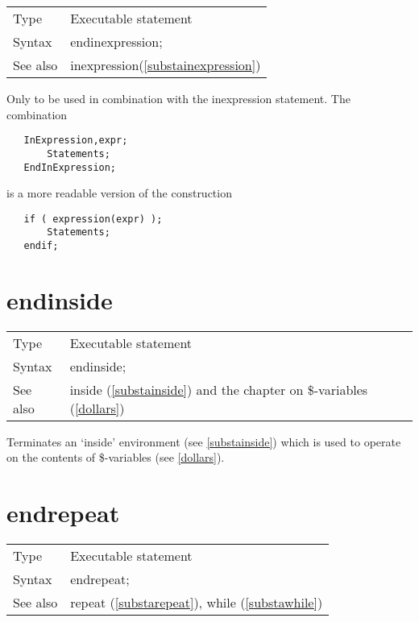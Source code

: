 \noindent \begin{tabular}{ll}
Type & Executable statement\\
Syntax & endinexpression;
\\ See also & inexpression(\ref{substainexpression})
\end{tabular} \vspace{4mm}

\noindent Only to be used in combination with the 
inexpression statement. The 
combination
\begin{verbatim}
   InExpression,expr;
       Statements;
   EndInExpression;
\end{verbatim}
is a more readable version of the construction
\begin{verbatim}
   if ( expression(expr) );
       Statements;
   endif;
\end{verbatim}
\vspace{10mm}


\section{endinside}
\label{substaendinside}

\noindent \begin{tabular}{ll}
Type & Executable statement\\
Syntax & endinside;
\\ See also & inside (\ref{substainside}) and the chapter on \$-variables 
(\ref{dollars})
\end{tabular}\vspace{4mm}

\noindent Terminates an `inside' 
environment (see \ref{substainside}) which is 
used to operate on the contents of \$-variables (see 
\ref{dollars}).\vspace{10mm}


\section{endrepeat}
\label{substaendrepeat}

\noindent \begin{tabular}{ll}
Type & Executable statement\\
Syntax & endrepeat;
\\ See also & repeat (\ref{substarepeat}), while (\ref{substawhile})
\end{tabular} \vspace{4mm}

